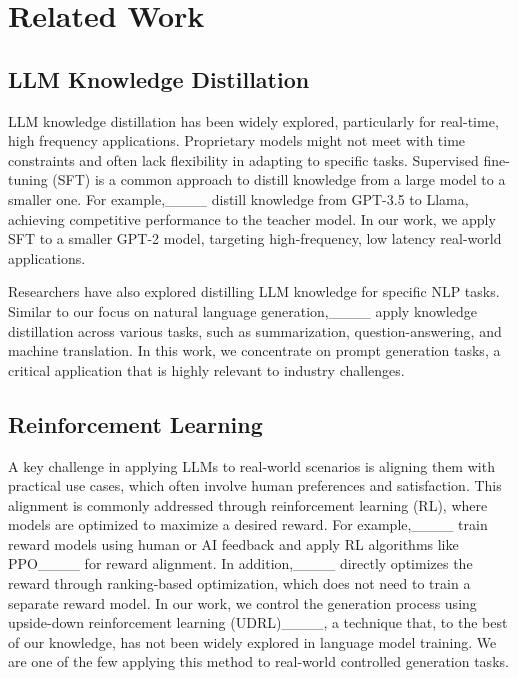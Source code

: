 \section{Related Work}
\subsection{LLM Knowledge Distillation}

LLM knowledge distillation has been widely explored, particularly for real-time, high frequency applications. Proprietary models might not meet with time constraints and often lack flexibility in adapting to specific tasks. Supervised fine-tuning (SFT) is a common approach to distill knowledge from a large model to a smaller one. For example,____ distill knowledge from GPT-3.5 to Llama, achieving competitive performance to the teacher model. In our work, we apply SFT to a smaller GPT-2 model, targeting high-frequency, low latency real-world applications.

Researchers have also explored distilling LLM knowledge for specific NLP tasks. Similar to our focus on natural language generation,____ apply knowledge distillation across various tasks, such as summarization, question-answering, and machine translation. In this work, we concentrate on prompt generation tasks, a critical application that is highly relevant to industry challenges.

\subsection{Reinforcement Learning}

A key challenge in applying LLMs to real-world scenarios is aligning them with practical use cases, which often involve human preferences and satisfaction. This alignment is commonly addressed through reinforcement learning (RL), where models are optimized to maximize a desired reward. For example,____ train reward models using human or AI feedback and apply RL algorithms like PPO____ for reward alignment. In addition,____ directly optimizes the reward through ranking-based optimization, which does not need to train a separate reward model. In our work, we control the generation process using upside-down reinforcement learning (UDRL)____, a technique that, to the best of our knowledge, has not been widely explored in language model training. We are one of the few applying this method to real-world controlled generation tasks.